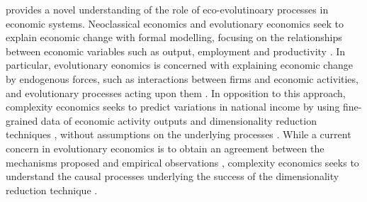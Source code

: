 % 
\chapiii provides a novel understanding of the role of eco-evolutinoary processes in economic systems. %
% 
% 
Neoclassical economics and evolutionary economics seek to explain economic change with formal modelling, focusing on the relationships between economic variables such as output, employment and productivity \cite{Boschma2005a}.
% 
% 
In particular, evolutionary eonomics is concerned with explaining economic change by endogenous forces, such as interactions between firms and economic activities, and evolutionary processes acting upon them \cite{Hodgson2019,Metcalfe2006}.
% 
% 
In opposition to this approach, complexity economics \cite{Hidalgo2021} seeks to predict variations in national income by using fine-grained data of economic activity outputs and dimensionality reduction techniques \cite{Mitchell}, without assumptions on the underlying processes \cite{Hidalgo}. 
% 
%
While a current concern in evolutionary economics is to obtain an agreement between the mechanisms proposed and empirical observations \xxx, complexity economics seeks to understand the causal processes underlying the success of the dimensionality reduction technique \xxx.

